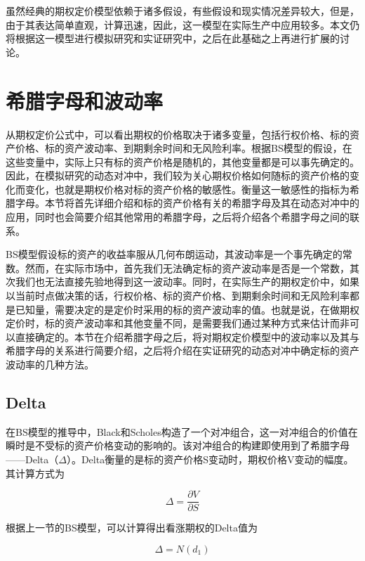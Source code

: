 虽然经典的期权定价模型依赖于诸多假设，有些假设和现实情况差异较大，但是，由于其表达简单直观，计算迅速，因此，这一模型在实际生产中应用较多。本文仍将根据这一模型进行模拟研究和实证研究中，之后在此基础之上再进行扩展的讨论。

\section{希腊字母和波动率}

从期权定价公式中，可以看出期权的价格取决于诸多变量，包括行权价格、标的资产价格、标的资产波动率、到期剩余时间和无风险利率。根据BS模型的假设，在这些变量中，实际上只有标的资产价格是随机的，其他变量都是可以事先确定的。因此，在模拟研究的动态对冲中，我们较为关心期权价格如何随标的资产价格的变化而变化，也就是期权价格对标的资产价格的敏感性。衡量这一敏感性的指标为希腊字母。本节将首先详细介绍和标的资产价格有关的希腊字母及其在动态对冲中的应用，同时也会简要介绍其他常用的希腊字母，之后将介绍各个希腊字母之间的联系。

BS模型假设标的资产的收益率服从几何布朗运动，其波动率是一个事先确定的常数。然而，在实际市场中，首先我们无法确定标的资产波动率是否是一个常数，其次我们也无法直接先验地得到这一波动率。同时，在实际生产的期权定价中，如果以当前时点做决策的话，行权价格、标的资产价格、到期剩余时间和无风险利率都是已知量，需要决定的是定价时采用的标的资产波动率的值。也就是说，在做期权定价时，标的资产波动率和其他变量不同，是需要我们通过某种方式来估计而非可以直接确定的。本节在介绍希腊字母之后，将对期权定价模型中的波动率以及其与希腊字母的关系进行简要介绍，之后将介绍在实证研究的动态对冲中确定标的资产波动率的几种方法。

\subsection{Delta}

在BS模型的推导中，Black和Scholes构造了一个对冲组合，这一对冲组合的价值在瞬时是不受标的资产价格变动的影响的。该对冲组合的构建即使用到了希腊字母——Delta（$\Delta$）。Delta衡量的是标的资产价格S变动时，期权价格V变动的幅度。其计算方式为

\begin{equation}
  \Delta=\frac{\partial V}{\partial S}
\end{equation}

根据上一节的BS模型，可以计算得出看涨期权的Delta值为

\begin{equation}
  \Delta=N(d_1)
\end{equation}

